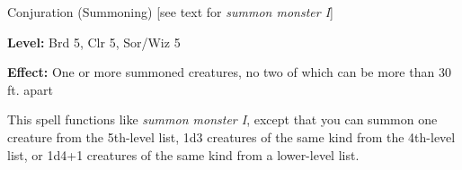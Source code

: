 
Conjuration (Summoning) [see text for \textit{summon monster I}]

\textbf{Level:} Brd 5, Clr 5, Sor/Wiz 5

\textbf{Effect:} One or more summoned creatures, no two of which can be more than 
30 ft. apart

This spell functions like \textit{summon monster I}, except that you can summon 
one creature from the 5th-level list, 1d3 creatures of the same kind from the 4th-level 
list, or 1d4+1 creatures of the same kind from a lower-level list.

